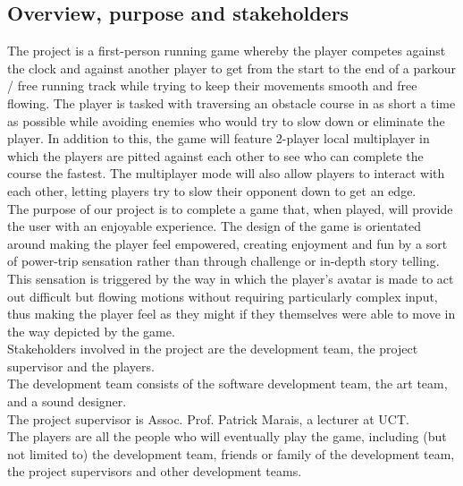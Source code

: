 \documentclass[a4paper,10pt]{article}
\begin{document}
\subsection{Overview, purpose and stakeholders}
The project is a first-person running game whereby the player competes against the clock and against another player to get from the start to the end of a parkour / free running track while trying to keep their movements smooth and free flowing. The player is tasked with traversing an obstacle course in as short a time as possible while avoiding enemies who would try to slow down or eliminate the player. In addition to this, the game will feature 2-player local multiplayer in which the players are pitted against each other to see who can complete the course the fastest. The multiplayer mode will also allow players to interact with each other, letting players try to slow their opponent down to get an edge.
\smallskip\\
The purpose of our project is to complete a game that, when played, will provide the user with an enjoyable experience. The design of the game is orientated around making the player feel empowered, creating enjoyment and fun by a sort of power-trip sensation rather than through challenge or in-depth story telling. This sensation is triggered by the way in which the player's avatar is made to act out difficult but flowing motions without requiring particularly complex input, thus making the player feel as they might if they themselves were able to move in the way depicted by the game.
\smallskip\\
Stakeholders involved in the project are the development team, the project supervisor and the players. \\
The development team consists of the software development team, the art team, and a sound designer. \\
The project supervisor is Assoc. Prof. Patrick Marais, a lecturer at UCT. \\
The players are all the people who will eventually play the game, including (but not limited to) the development team, friends or family of the development team, the project supervisors and other development teams.
\end{document}
